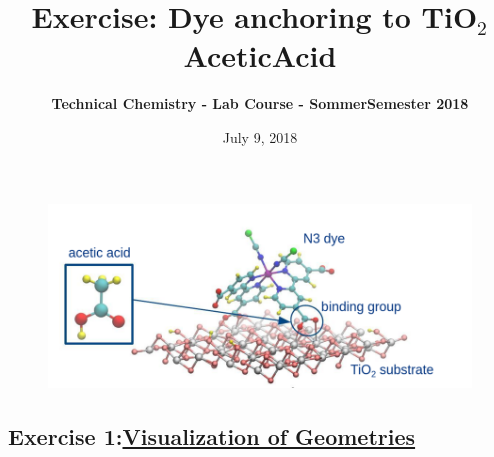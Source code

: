 \documentclass[]{article}
\begin{document}
\title{\textbf{Exercise: Dye anchoring to  TiO$_{2}$ AceticAcid}}
\author{\textbf{Technical Chemistry - Lab Course - SommerSemester 2018}}
\date{July 9, 2018}

\maketitle

\begin{figure}
\centering
\includegraphics[width=0.80\linewidth]{dye1.png}
\label{fig:dye1}
\end{figure}


\subsection*{Exercise 1:\underline{Visualization of Geometries}}
\end{document}
